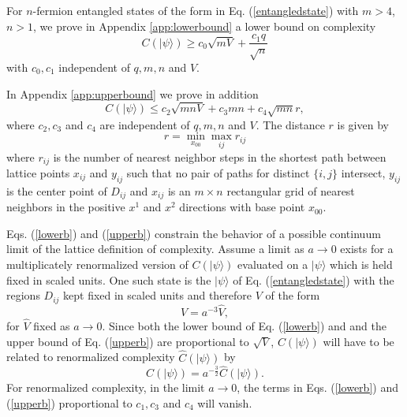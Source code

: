 \documentclass[12pt,amsmath,amssymb,onecolumn]{revtex4-2}
\begin{document}
For $n$-fermion entangled states of the form in Eq. (\ref{entangledstate})
with $m > 4$, $n > 1$,
we prove in Appendix \ref{app:lowerbound} a lower bound on complexity
\begin{equation}
\label{lowerb}
C( |\psi \rangle ) \geq c_0 \sqrt{m V} + \frac{ c_1 q}{\sqrt{n}}
\end{equation}
with $c_0, c_1$ independent of $q, m, n$ and $V$.

In Appendix \ref{app:upperbound} we prove in addition
\begin{equation}
\label{upperb}
C( |\psi \rangle ) \leq c_2 \sqrt{m n V} + c_3m n + c_4\sqrt{mn} r,
\end{equation}
where $c_2, c_3$ and $c_4$ are  independent of $q, m, n$ and $V$.
The distance $r$ is given by
\begin{equation}
  \label{defsbar}
  r = \min_{x_{00}} \max_{ij} r_{ij}
\end{equation}
where $r_{ij}$ is the number of nearest
neighbor steps in the
shortest path between
lattice points $x_{ij}$ and $y_{ij}$
such that no pair of paths for distinct
$\{i, j\}$ intersect,
$y_{ij}$ is the center point of $D_{ij}$
and $x_{ij}$ is an $m \times n$ rectangular grid
of nearest neighbors in the positive $x^1$ and $x^2$ directions
with base point $x_{00}$.

Eqs. (\ref{lowerb}) and (\ref{upperb}) constrain
the behavior of a possible
continuum limit of the lattice definition
of complexity.  
Assume a limit as $a \rightarrow 0$  exists for
a multiplicately 
renormalized version of $C( |\psi \rangle )$
evaluated on a $|\psi \rangle$ which is held fixed
in scaled units.
One such state is the $|\psi \rangle$ of Eq. (\ref{entangledstate})
with the regions $D_{ij}$ kept fixed in scaled units
and therefore $V$ of the form
\begin{equation}
  \label{rescaledv}
  V = a^{-3} \hat{V},
\end{equation}
for $\hat{V}$ fixed as $a \rightarrow 0$.
Since both the lower bound of Eq. (\ref{lowerb}) and
and the upper bound of Eq. (\ref{upperb})
are proportional to $\sqrt{V}$,
$C( |\psi \rangle )$ will have to be related to
renormalized complexity
$\hat{C}( |\psi \rangle )$ by
\begin{equation}
  \label{rescaledc}
  C( |\psi \rangle ) = a^{-\frac{3}{2}} \hat{C}( |\psi \rangle ).
\end{equation}
For renormalized complexity,
in the limit $a \rightarrow 0$, the terms in Eqs. (\ref{lowerb})
and (\ref{upperb}) proportional to $c_1, c_3$ and $c_4$
will vanish.
 
\end{document}
